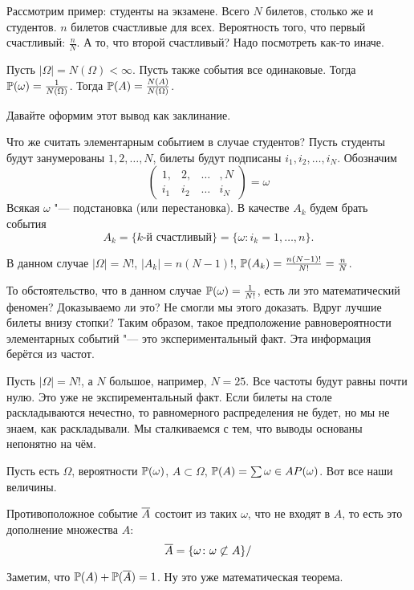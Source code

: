Рассмотрим пример: студенты на экзамене. Всего $N$ билетов, столько же и студентов. $n$ билетов счастливые для всех. Вероятность того, что первый счастливый: $\frac nN$. А то, что второй счастливый? Надо посмотреть как-то иначе.

Пусть $|\Omega|= N(\Omega)<\infty$. Пусть также события все одинаковые. Тогда $\P(\omega) = \frac1{N(\Omega)}$. Тогда $\P(A) = \frac{N(A)}{N(\Omega)}$.

Давайте оформим этот вывод как заклинание. 

Что же считать элементарным событием в случае студентов? Пусть студенты будут занумерованы $1,2,\dots,N$, билеты будут подписаны $i_1,i_2,\dots,i_N$. Обозначим
\[
  \begin{pmatrix}
1,&2,&\dots&,N\\
i_1& i_2&\dots &i_N
\end{pmatrix} = \omega
\]
Всякая $\omega$ "--- подстановка (или перестановка). В качестве $A_k$ будем брать события
\[
  A_k = \{k\text{-й счастливый}\} = \{\omega\colon i_k = 1,\dots,n\}.
\]

В данном случае $|\Omega| = N!$, $|A_k| = n (N-1)!$, $\P(A_k) = \frac{n(N-1)!}{N!} = \frac nN$.

То обстоятельство, что в данном случае $\P(\omega) = \frac1{N!}$, есть ли это математический феномен? Доказываемо ли это? Не смогли мы этого доказать. Вдруг лучшие билеты внизу стопки? Таким образом, такое предположение равновероятности элементарных событий "--- это экспериментальный факт. Эта информация берётся из частот.

Пусть $|\Omega|=N!$, а $N$ большое, например, $N=25$. Все частоты будут равны почти нулю. Это уже не экспирементальный факт. Если билеты на столе раскладываются нечестно, то равномерного распределения не будет, но мы не знаем, как раскладывали. Мы сталкиваемся с тем, что выводы основаны непонятно на чём. 


Пусть есть $\Omega$, вероятности $\P(\omega)$, $A\subset \Omega$, $\P(A) = \sum\limits{\omega\in A}P(\omega)$. Вот все наши величины.

\begin{Def}
Противоположное событие $\ol A$ состоит из таких $\omega$, что не входят в $A$, то есть это дополнение множества $A$:
\[
  \ol A = \{\omega\colon \omega\not\subset A\}/
\]
\end{Def}

Заметим, что $\P(A) + \P(\ol A) = 1$. Ну это уже математическая теорема.


